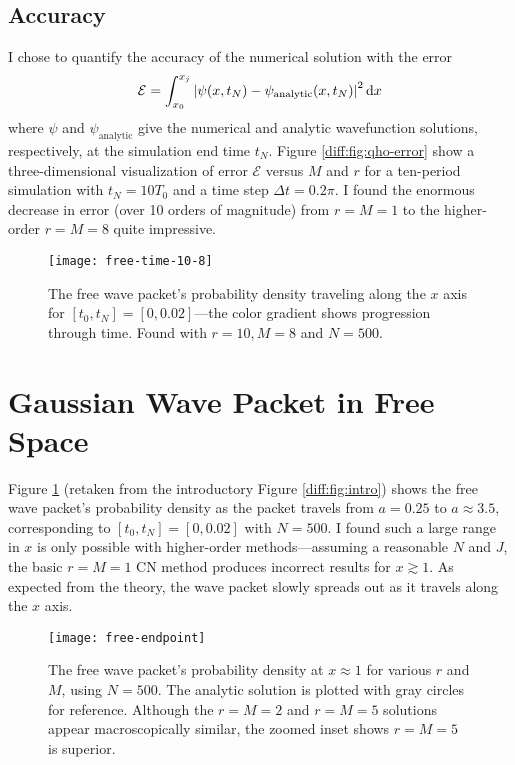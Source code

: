 \documentclass[11pt, a4paper]{article}
\newcommand{\diff}{\mathop{}\!\mathrm{d}} %
\begin{document}
\subsection{Accuracy}
I chose to quantify the accuracy of the numerical solution with the error
\begin{equation}
	\mathcal{E} = \int_{x_{0}}^{x_{j}} \abs{\psi(x, t_{N}) - \psi_{\text{analytic}}(x, t_{N})}^{2} \diff x \label{diff:eq:error}
\end{equation}
where $ \psi $ and $ \psi_{\text{analytic}} $ give the numerical and analytic wavefunction solutions, respectively, at the simulation end time $ t_{N} $. Figure \ref{diff:fig:qho-error} show a three-dimensional visualization of error $ \mathcal{E} $ versus $ M $ and $ r $ for a ten-period simulation with $ t_{N} = 10 T_{0} $ and a time step $ \Delta t = 0.2 \pi $. I found the enormous decrease in error (over 10 orders of magnitude) from $ r = M = 1 $ to the higher-order $ r = M = 8 $ quite impressive.






\begin{figure}[htb!]
\centering
\texttt{[image: free-time-10-8]}
\caption{The free wave packet's probability density traveling along the $ x $ axis for $ [t_{0}, t_{N}] = [0, 0.02] $---the color gradient shows progression through time. Found with $ r = 10, M = 8 $ and $ N = 500 $.}
\label{diff:fig:free-time}
\end{figure}

\section{Gaussian Wave Packet in Free Space}
Figure \ref{diff:fig:free-time} (retaken from the introductory Figure \ref{diff:fig:intro}) shows the free wave packet's probability density as the packet travels from $ a = 0.25 $ to $ a \approx 3.5 $, corresponding to $ [t_{0}, t_{N}] = [0, 0.02] $ with $ N = 500 $. I found such a large range in $ x $ is only possible with higher-order methods---assuming a reasonable $ N $ and $ J $, the basic $ r = M = 1 $ CN method produces incorrect results for $ x \gtrsim 1 $. As expected from the theory, the wave packet slowly spreads out as it travels along the $ x $ axis.

\begin{figure}[htb!]
\centering
\texttt{[image: free-endpoint]}
\caption{The free wave packet's probability density at $ x \approx 1 $ for various $ r $ and $ M $, using $ N = 500 $. The analytic solution is plotted with gray circles for reference. Although the $ r = M = 2 $ and $ r = M = 5 $ solutions appear macroscopically similar, the zoomed inset shows $ r = M = 5 $ is superior.}
\label{diff:fig:free-endpoint}
\end{figure}
\end{document}
